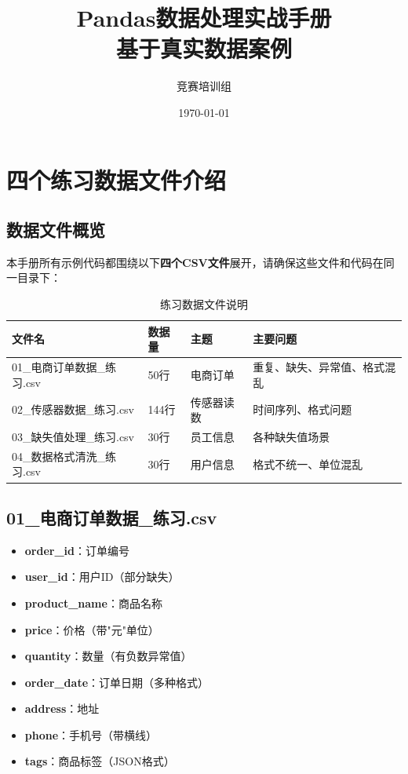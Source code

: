 \documentclass[12pt,a4paper]{article}
\title{\textbf{Pandas数据处理实战手册}\\[0.5em]\large 基于真实数据案例}
\author{竞赛培训组}
\date{\today}
\begin{document}
\maketitle
\tableofcontents
\newpage

\section{四个练习数据文件介绍}

\subsection{数据文件概览}

本手册所有示例代码都围绕以下\textbf{四个CSV文件}展开，请确保这些文件和代码在同一目录下：

\begin{table}[H]
\centering
\caption{练习数据文件说明}
\begin{tabular}{|l|l|l|l|}
\hline
\textbf{文件名} & \textbf{数据量} & \textbf{主题} & \textbf{主要问题} \\
\hline
01\_电商订单数据\_练习.csv & 50行 & 电商订单 & 重复、缺失、异常值、格式混乱 \\
\hline
02\_传感器数据\_练习.csv & 144行 & 传感器读数 & 时间序列、格式问题 \\
\hline
03\_缺失值处理\_练习.csv & 30行 & 员工信息 & 各种缺失值场景 \\
\hline
04\_数据格式清洗\_练习.csv & 30行 & 用户信息 & 格式不统一、单位混乱 \\
\hline
\end{tabular}
\end{table}

\subsection{01\_电商订单数据\_练习.csv}

\begin{knowledgebox}[数据字段说明]
\begin{itemize}
    \item \textbf{order\_id}：订单编号
    \item \textbf{user\_id}：用户ID（部分缺失）
    \item \textbf{product\_name}：商品名称
    \item \textbf{price}：价格（带"元"单位）
    \item \textbf{quantity}：数量（有负数异常值）
    \item \textbf{order\_date}：订单日期（多种格式）
    \item \textbf{address}：地址
    \item \textbf{phone}：手机号（带横线）
    \item \textbf{tags}：商品标签（JSON格式）
\end{itemize}
\end{knowledgebox}
\end{document}
